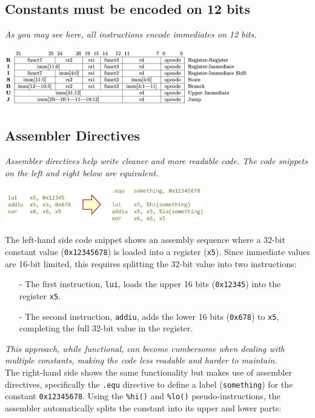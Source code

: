 \subsection{Constants must be encoded on 12 bits}
\textit{As you may see here, all instructions encode immediates on 12 bits.}
\begin{center}
    \includegraphics[width=0.8\textwidth]{chapters/chapter1b/images/riscv.png}
\end{center}

\subsection{Assembler Directives} \textit{Assembler directives help write cleaner and more readable code. The code snippets on the left and right below are equivalent.}

\begin{center} \includegraphics[width=0.65\textwidth]{chapters/chapter1b/images/directives.png} \end{center}

The left-hand side code snippet shows an assembly sequence where a 32-bit constant value (\texttt{0x12345678}) is loaded into a register (\texttt{x5}). Since immediate values are 16-bit limited, this requires splitting the 32-bit value into two instructions: 

\begin{itemize}
    \item[-] The first instruction, \texttt{lui}, loads the upper 16 bits (\texttt{0x12345}) into the register \texttt{x5}.
    \item[-] The second instruction, \texttt{addiu}, adds the lower 16 bits (\texttt{0x678}) to \texttt{x5}, completing the full 32-bit value in the register.
\end{itemize}

\textit{This approach, while functional, can become cumbersome when dealing with multiple constants, making the code less readable and harder to maintain. \\
} 
\vspace*{5px}
The right-hand side shows the same functionality but makes use of assembler directives, specifically the \texttt{.equ} directive to define a label (\texttt{something}) for the constant \texttt{0x12345678}. Using the \texttt{\%hi()} and \texttt{\%lo()} pseudo-instructions, the assembler automatically splits the constant into its upper and lower parts:

